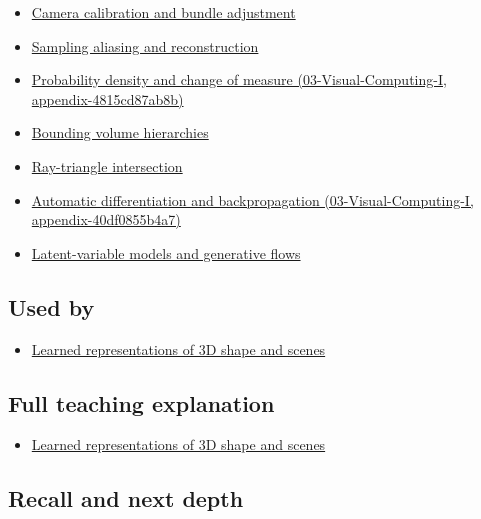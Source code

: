 \begin{itemize}
\tightlist
\item
  \hyperref[appendix-3ee9861904d5]{Camera calibration and bundle adjustment}
\item
  \hyperref[appendix-6a7869dd79a6]{Sampling aliasing and reconstruction}
\item
  \href{}{Probability density and change of measure (03-Visual-Computing-I, appendix-4815cd87ab8b)}
\item
  \hyperref[appendix-0b426c47dd78]{Bounding volume hierarchies}
\item
  \hyperref[appendix-47ac1bd6d144]{Ray-triangle intersection}
\item
  \href{}{Automatic differentiation and backpropagation (03-Visual-Computing-I, appendix-40df0855b4a7)}
\item
  \hyperref[appendix-2c568f05ee34]{Latent-variable models and generative flows}
\end{itemize}

\subsection{Used by}\label{used-by}

\begin{itemize}
\tightlist
\item
  \href{Continuous\%20Notes/University\%20-\%20Worlds,\%20Images\%20and\%20Inference\%20-\%20Graphics,\%20Vision\%20and\%20Photography\#Learned\%20representations\%20of\%203D\%20shape\%20and\%20scenes}{Learned representations of 3D shape and scenes}
\end{itemize}

\subsection{Full teaching explanation}\label{full-teaching-explanation}

\begin{itemize}
\tightlist
\item
  \href{Continuous\%20Notes/University\%20-\%20Worlds,\%20Images\%20and\%20Inference\%20-\%20Graphics,\%20Vision\%20and\%20Photography\#Learned\%20representations\%20of\%203D\%20shape\%20and\%20scenes}{Learned representations of 3D shape and scenes}
\end{itemize}

\subsection{Recall and next depth}\label{recall-and-next-depth}

